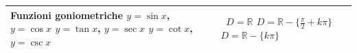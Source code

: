 \begin{table}
\begin{tabularx}{1,2\textwidth}{XXX}
  \textbf{Funzioni goniometriche} \newline $y=\sin{x}$, 
$y=\cos{x}$ \newline \newline $y=\tan x$, $y=\sec x$ \newline  \newline 
$y=\cot x$, $y=\csc x$ 
  & $\,$ \newline $D=\mathbb{R}$ \newline  \newline 
$D=\mathbb{R} -\bigl\{\frac{\pi}{2}+k\pi \bigr\}$\newline \newline 
$D=\mathbb{R} -\{k\pi\}$
  &  \\
  \midrule
  
\end{tabularx}
\end{table}

